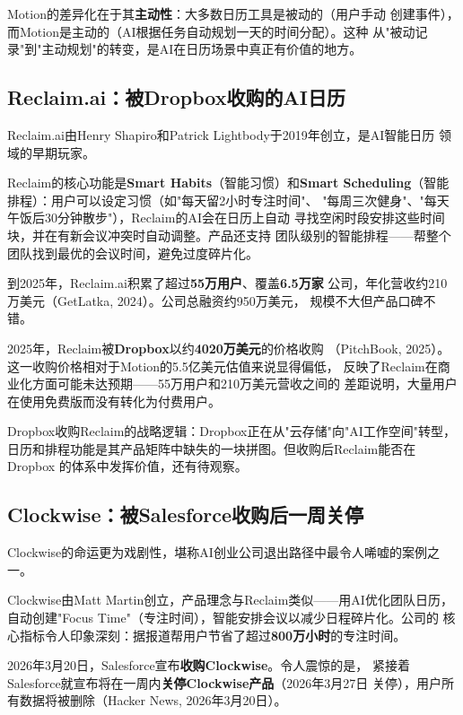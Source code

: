 Motion的差异化在于其\textbf{主动性}：大多数日历工具是被动的（用户手动
创建事件），而Motion是主动的（AI根据任务自动规划一天的时间分配）。这种
从"被动记录"到"主动规划"的转变，是AI在日历场景中真正有价值的地方。

\subsection{Reclaim.ai：被Dropbox收购的AI日历}
\label{subsec:reclaim}

Reclaim.ai由Henry Shapiro和Patrick Lightbody于2019年创立，是AI智能日历
领域的早期玩家。

Reclaim的核心功能是\textbf{Smart Habits}（智能习惯）和\textbf{Smart
Scheduling}（智能排程）：用户可以设定习惯（如"每天留2小时专注时间"、
"每周三次健身"、"每天午饭后30分钟散步"），Reclaim的AI会在日历上自动
寻找空闲时段安排这些时间块，并在有新会议冲突时自动调整。产品还支持
团队级别的智能排程——帮整个团队找到最优的会议时间，避免过度碎片化。

到2025年，Reclaim.ai积累了超过\textbf{55万用户}、覆盖\textbf{6.5万家}
公司，年化营收约210万美元（GetLatka, 2024）。公司总融资约950万美元，
规模不大但产品口碑不错。

2025年，Reclaim被\textbf{Dropbox}以约\textbf{4020万美元}的价格收购
（PitchBook, 2025）。这一收购价格相对于Motion的5.5亿美元估值来说显得偏低，
反映了Reclaim在商业化方面可能未达预期——55万用户和210万美元营收之间的
差距说明，大量用户在使用免费版而没有转化为付费用户。

Dropbox收购Reclaim的战略逻辑：Dropbox正在从"云存储"向"AI工作空间"转型，
日历和排程功能是其产品矩阵中缺失的一块拼图。但收购后Reclaim能否在Dropbox
的体系中发挥价值，还有待观察。

\subsection{Clockwise：被Salesforce收购后一周关停}
\label{subsec:clockwise}

Clockwise的命运更为戏剧性，堪称AI创业公司退出路径中最令人唏嘘的案例之一。

Clockwise由Matt Martin创立，产品理念与Reclaim类似——用AI优化团队日历，
自动创建"Focus Time"（专注时间），智能安排会议以减少日程碎片化。公司的
核心指标令人印象深刻：据报道帮用户节省了超过\textbf{800万小时}的专注时间。

2026年3月20日，Salesforce宣布\textbf{收购Clockwise}。令人震惊的是，
紧接着Salesforce就宣布将在一周内\textbf{关停Clockwise产品}（2026年3月27日
关停），用户所有数据将被删除（Hacker News, 2026年3月20日）。

